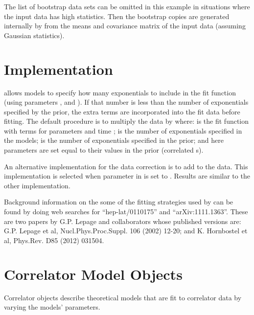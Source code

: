 \documentclass[letterpaper,10pt,english]{sphinxmanual}
\begin{document}
The list of bootstrap data sets  can be omitted in this example
in situations where the input data has high statistics. Then the bootstrap
copies are generated internally by  from the
means and covariance matrix of the input data (assuming Gaussian statistics).


\section{Implementation}
\label{corrfitter:implementation}
{\hyperref[corrfitter:corrfitter.CorrFitter]{}} allows models to specify how many exponentials to include in the
fit function (using parameters ,  and ). If that
number is less than the number of exponentials specified by the prior, the
extra terms are incorporated into the fit data before fitting. The default
procedure is to multiply the data by  where:
 is the fit function with  terms for parameters  and
time ;  is the number of exponentials specified in the models;
 is the number of exponentials specified in the prior; and here
parameters  are set equal to their values in the prior (correlated
s).

An alternative implementation for the data correction is to add
 to the data. This implementation is selected
when parameter  in {\hyperref[corrfitter:corrfitter.CorrFitter]{}} is set to . Results are
similar to the other implementation.

Background information on the some of the fitting strategies used by
{\hyperref[corrfitter:corrfitter.CorrFitter]{}} can be found by doing web searches for ``hep-lat/0110175'' and
``arXiv:1111.1363''. These are two papers by G.P. Lepage and collaborators
whose published versions are: G.P. Lepage et al, Nucl.Phys.Proc.Suppl.
106 (2002) 12-20; and K. Hornbostel et al, Phys.Rev. D85 (2012) 031504.


\section{Correlator Model Objects}
\label{corrfitter:correlator-model-objects}
Correlator objects describe theoretical models that are fit to
correlator data by varying the models' parameters.
\end{document}
